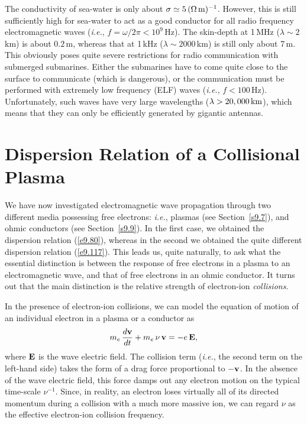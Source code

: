 The conductivity of sea-water is only about $\sigma\simeq 5\,(\Omega\,{\rm m})^{-1}$. However, this is still sufficiently high for sea-water to act as
a good conductor for all radio frequency electromagnetic waves ({\em i.e.}, $f=\omega/2\pi < 10^9$\,Hz). The skin-depth at 1\,MHz ($\lambda\sim 2$\,km)
is about $0.2$\,m, whereas that at 1\,kHz ($\lambda\sim 2000$\,km)
is still only about 7\,m. This obviously poses quite severe restrictions for
radio communication with submerged submarines. Either the submarines
have to come quite close to the surface to communicate (which is dangerous), or the communication must be performed with extremely low frequency (ELF) waves ({\em i.e.}, $f< 100$\,Hz). Unfortunately, such waves have very large wavelengths ($\lambda > 20,000\,{\rm km}$), which means
that they can only be efficiently generated by gigantic
antennas. 

\section{Dispersion Relation of a Collisional Plasma}
We have now investigated electromagnetic wave propagation
through two different media possessing free electrons: {\em i.e.}, plasmas (see Section~\ref{s9.7}), and
 ohmic conductors (see Section~\ref{s9.9}). In the first case, we
obtained the dispersion relation (\ref{e9.80}), whereas in the second
we obtained the quite different dispersion relation (\ref{e9.117}).
This leads us, quite naturally, to ask what the essential distinction is between
the response of  free electrons in a plasma to an electromagnetic
wave, and that of  free electrons in an ohmic conductor.
It turns out that the main distinction is the relative strength of electron-ion
{\em collisions}. 

In the presence of electron-ion collisions, we can model the equation
of motion of an individual electron in a plasma or a conductor as
\begin{equation}\label{e9.127}
m_e\,\frac{d{\bf v}}{dt} + m_e\,\nu\,{\bf v} = -e\,{\bf E},
\end{equation}
where ${\bf E}$ is the wave electric field. The collision term ({\em i.e.}, the second term on the left-hand side) takes the form of 
a drag force proportional to $-{\bf v}$. In the absence of the wave electric
field, this force damps out any electron motion on the typical time-scale
$\nu^{-1}$. Since, in reality, an electron loses virtually all of its directed momentum during a collision with a much more massive ion, we can regard
$\nu$ as the effective electron-ion collision frequency.

